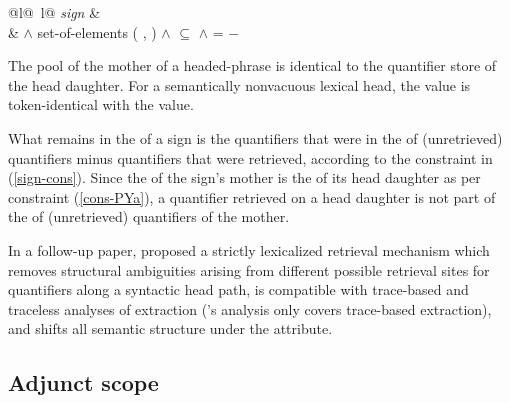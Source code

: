 \documentclass[output=paper,biblatex,babelshorthands,newtxmath,draftmode,colorlinks,citecolor=brown]{langscibook}
\begin{document}
\begin{exe}
\ex\label{sign-cons}
\begin{tabular}{@{}l@{~}l@{}}
\emph{sign} \impl&
 \\
& $\land$ set-of-elements ( , )
$\land$  $\subseteq$ 
$\land$  =  $-$ 
\end{tabular}
\end{exe}

\begin{exe}
\ex\label{cons-PY}
\begin{xlist}
\ex \label{cons-PYa} The pool of the mother of a headed-phrase is identical to the quantifier store of the head daughter. 
\ex \label{cons-PYb} For a semantically nonvacuous lexical head, the  value is token-identical with the  value.
\end{xlist}
\end{exe}

\noindent
What remains in the  of a sign is the quantifiers that were in the  of (unretrieved) quantifiers minus quantifiers that were retrieved, according to the  constraint in (\ref{sign-cons}). Since the  of  the sign's mother is the  of its head daughter as per constraint (\ref{cons-PYa}), a quantifier retrieved on a head daughter is not part of the  of (unretrieved) quantifiers of the mother. 

In a follow-up paper, \citet{Przepiorkowski1998b} proposed a strictly lexicalized retrieval mechanism which removes structural ambiguities arising from different possible retrieval sites for quantifiers along a syntactic head path, is compatible with trace-based and traceless analyses of extraction (\citeauthor{PollardandYoo1998}'s analysis only covers trace-based extraction), and shifts all semantic structure under the  attribute.



\subsection{Adjunct scope}
\label{semantics-sec-adjunct-scope}
\end{document}
